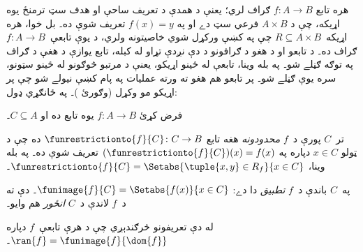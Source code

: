 \documentclass[../../../include/open-logic-section]{subfiles}
\begin{document}
\begin{explain}
هره تابع $f\colon A \to B$ ګراف لري؛ يعنې د همدې د تعريف ساحې
او هدف سټ ترمنځ يوه اړيکه، چې د $A \times B$ فرعي سټ دے او په $f(x) = y$
تعريف شوې ده۔ بل خوا، هره اړيکه~$R
\subseteq A \times B$ چې په  کښې ورکړل
شوي خاصيتونه ولري، د يوې تابعې~$f \colon A \to B$ ګراف ده۔ د
تابعو او د هغو د ګرافونو د دې نږدې تړاو له کبله، تابع يوازې د
هغې د ګراف په توګه ګڼلے شو۔ په بله وينا، تابعې له ځينو اړيکو،
يعنې د مرتبو څوګونو له ځينو سټونو، سره يوې ګڼلے شو۔
 پر تابعو هم هغو ته ورته عمليات په
پام کښې نيولے شو چې پر اړيکو مو وکړل (وګورئ
)۔ په ځانګړي ډول:
\end{explain}

\begin{defn}
فرض کړئ $f \colon A \to B$ يوه تابع ده او $C\subseteq A$۔

تر~$C$ پورې د~$f$ \emph{محدودونه} هغه تابع
$\funrestrictionto{f}{C}\colon C \to B$ ده چې د ټولو $x \in C$
دپاره په $(\funrestrictionto{f}{C})(x) = f(x)$ تعريف شوې ده۔ په بله
وينا، $\funrestrictionto{f}{C} = \Setabs{\tuple{x, y} \in R_f}{x \in
C}$۔

په~$C$ باندې د~$f$ \emph{تطبيق} دا دے: $\funimage{f}{C} =
\Setabs{f(x)}{x \in C}$۔ دې ته د~$f$ لاندې د~$C$ \emph{انځور} هم وايو۔
\end{defn}

\begin{explain}
له دې تعريفونو څرګندېږي چې د هرې تابعې~$f$ دپاره
$\ran{f} = \funimage{f}{\dom{f}}$۔
\end{explain}
\end{document}

